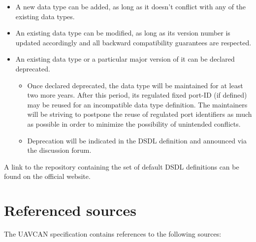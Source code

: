 \begin{itemize}
    \item A new data type can be added, as long as it doesn't conflict with any of the existing data types.

    \item An existing data type can be modified, as long as its version number is updated accordingly
    and all backward compatibility guarantees are respected.

    \item An existing data type or a particular major version of it can be declared deprecated.
    \begin{itemize}
        \item Once declared deprecated, the data type will be maintained for at least two more years.
        After this period, its regulated fixed port-ID (if defined) may be reused for
        an incompatible data type definition.
        The maintainers will be striving to postpone the reuse of regulated port identifiers as much as
        possible in order to minimize the possibility of unintended conflicts.

        \item Deprecation will be indicated in the DSDL definition and announced via the discussion forum.
    \end{itemize}
\end{itemize}

A link to the repository containing the set of default DSDL definitions can be found on the official website.

\section{Referenced sources}

The UAVCAN specification contains references to the following sources:


